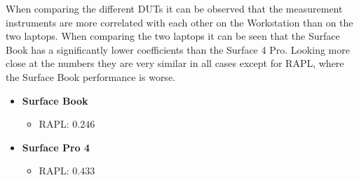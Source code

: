 When comparing the different DUTs it can be observed that the measurement instruments are more correlated with each other on the Workstation than on the two laptops. When comparing the two laptops it can be seen that the Surface Book has a significantly lower coefficients than the Surface 4 Pro. Looking more close at the numbers they are very similar in all cases except for RAPL, where the Surface Book performance is worse.

\begin{itemize}
    \item \textbf{Surface Book}
    \begin{itemize}
        \item RAPL: $0.246$
    \end{itemize}
    \item \textbf{Surface Pro 4}
    \begin{itemize}
        \item RAPL: $0.433$
    \end{itemize}
\end{itemize}










